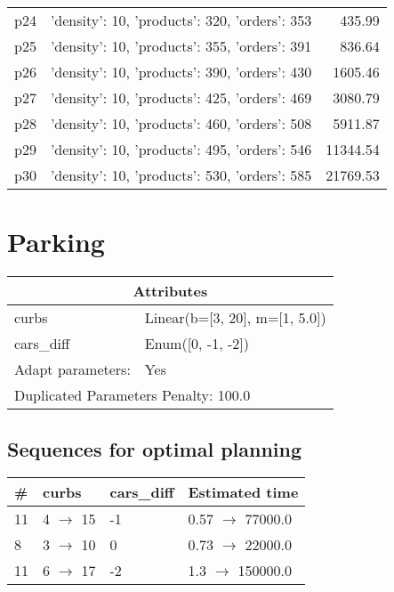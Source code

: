 \documentclass{article}
\begin{document}
\begin{center}
\begin{tabular}{@{}l|r|r@{}}
  p24&{'density': 10, 'products': 320, 'orders': 353}&435.99\\
  p25&{'density': 10, 'products': 355, 'orders': 391}&836.64\\
  p26&{'density': 10, 'products': 390, 'orders': 430}&1605.46\\
  p27&{'density': 10, 'products': 425, 'orders': 469}&3080.79\\
  p28&{'density': 10, 'products': 460, 'orders': 508}&5911.87\\
  p29&{'density': 10, 'products': 495, 'orders': 546}&11344.54\\
  p30&{'density': 10, 'products': 530, 'orders': 585}&21769.53
                            \end{tabular}
                            \end{center}
                    
                            \newpage \section{Parking}
                    \begin{center}
                    \begin{tabular}{@{}p{}p{}@{}}
                    \multicolumn{2}{c}{\bf \large Attributes}\\\midrule
                    curbs & Linear(b=[3, 20], m=[1, 5.0])\\
cars\_diff & Enum([0, -1, -2])
                    \\\midrule
                    Adapt parameters: & Yes \\\midrule
                    \multicolumn{2}{l}{Duplicated Parameters Penalty: 100.0}
                    \end{tabular}
                    \end{center}
                
                            \subsection*{Sequences for optimal planning}

                            \begin{center}
                            \begin{tabular}{@{}l|l|l|l@{}}
                            \# & curbs & cars\_diff & Estimated time\\\midrule
                            11&4 $\rightarrow$ 15&-1&0.57 $\rightarrow$ 77000.0\\
8&3 $\rightarrow$ 10&0&0.73 $\rightarrow$ 22000.0\\
11&6 $\rightarrow$ 17&-2&1.3 $\rightarrow$ 150000.0
                            \end{tabular}
                            \end{center}
                    
\end{document}
